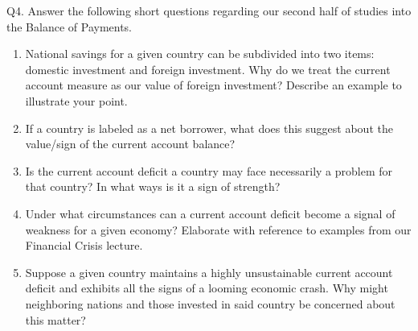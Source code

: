 \documentclass[12pt]{article}
\begin{document}
\noindent Q4. Answer the following short questions regarding our second half of studies into the Balance of Payments.

\begin{enumerate}[1)]
\item National savings for a given country can be subdivided into two items: domestic investment and foreign investment. Why do we treat the current account measure as our value of foreign investment? Describe an example to illustrate your point.

\vspace{2in}
\item If a country is labeled as a net borrower, what does this suggest about the value/sign of the current account balance?

\vspace{2in}


\newpage



\item Is the current account deficit a country may face necessarily a problem for that country? In what ways is it a sign of strength?

\vspace{2in}

\item Under what circumstances can a current account deficit become a signal of weakness for a given economy? Elaborate with reference to examples from our Financial Crisis lecture.

\vspace{2.5in}


\item Suppose a given country maintains a highly unsustainable current account deficit and exhibits all the signs of a looming economic crash. 
Why might neighboring nations and those invested in said country be concerned about this matter? 


\end{enumerate}
\end{document}
